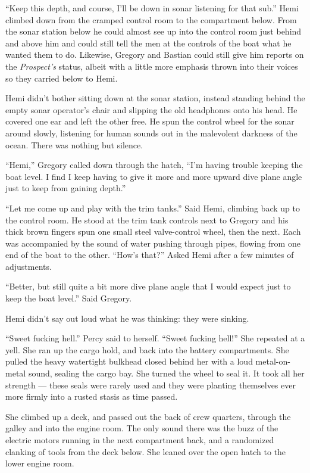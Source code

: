\documentclass[]{article}
\begin{document}
\begin{multicols}{2}
``Keep this depth, and course, I'll be down in sonar listening for that
sub.'' Hemi climbed down from the cramped control room to the
compartment below. From the sonar station below he could almost see up
into the control room just behind and above him and could still tell the
men at the controls of the boat what he wanted them to do. Likewise,
Gregory and Bastian could still give him reports on the
\emph{Prospect's} status, albeit with a little more emphasis thrown into
their voices so they carried below to Hemi.

Hemi didn't bother sitting down at the sonar station, instead standing
behind the empty sonar operator's chair and slipping the old headphones
onto his head. He covered one ear and left the other free. He spun the
control wheel for the sonar around slowly, listening for human sounds
out in the malevolent darkness of the ocean. There was nothing but
silence.

``Hemi,'' Gregory called down through the hatch, ``I'm having trouble
keeping the boat level. I find I keep having to give it more and more
upward dive plane angle just to keep from gaining depth.''

``Let me come up and play with the trim tanks.'' Said Hemi, climbing
back up to the control room. He stood at the trim tank controls next to
Gregory and his thick brown fingers spun one small steel valve-control
wheel, then the next. Each was accompanied by the sound of water pushing
through pipes, flowing from one end of the boat to the other. ``How's
that?'' Asked Hemi after a few minutes of adjustments.

``Better, but still quite a bit more dive plane angle that I would
expect just to keep the boat level.'' Said Gregory.

Hemi didn't say out loud what he was thinking: they were sinking.

``Sweet fucking hell.'' Percy said to herself. ``Sweet fucking hell!''
She repeated at a yell. She ran up the cargo hold, and back into the
battery compartments. She pulled the heavy watertight bulkhead closed
behind her with a loud metal-on-metal sound, sealing the cargo bay. She
turned the wheel to seal it. It took all her strength --- these seals
were rarely used and they were planting themselves ever more firmly into
a rusted stasis as time passed.

She climbed up a deck, and passed out the back of crew quarters, through
the galley and into the engine room. The only sound there was the buzz
of the electric motors running in the next compartment back, and a
randomized clanking of tools from the deck below. She leaned over the
open hatch to the lower engine room.


\end{multicols}
\end{document}
